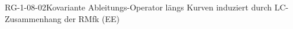 
\begin{PROP}{RG-1-08-02}{Kovariante Ableitungs-Operator längs Kurven induziert durch LC-Zusammenhang der RMfk (EE)}
\end{PROP}
